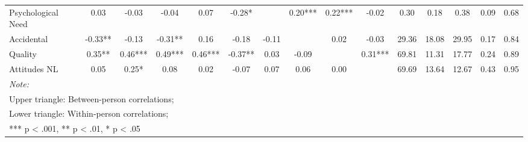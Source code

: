 \begin{table}
\begin{minipage}[t][\textheight][t]{\textwidth}
{\begin{tabular}[t]{lcccccccccccccc}
\hspace{1em}Psychological Need & 0.03 & -0.03 & -0.04 & 0.07 & -0.28* &  & 0.20*** & 0.22*** & -0.02 & 0.30 & 0.18 & 0.38 & 0.09 & 0.68\\
\hspace{1em}Accidental & -0.33** & -0.13 & -0.31** & 0.16 & -0.18 & -0.11 &  & 0.02 & -0.03 & 29.36 & 18.08 & 29.95 & 0.17 & 0.84\\
\hspace{1em}Quality & 0.35** & 0.46*** & 0.49*** & 0.46*** & -0.37** & 0.03 & -0.09 &  & 0.31*** & 69.81 & 11.31 & 17.77 & 0.24 & 0.89\\
\hspace{1em}Attitudes NL & 0.05 & 0.25* & 0.08 & 0.02 & -0.07 & 0.07 & 0.06 & 0.00 &  & 69.69 & 13.64 & 12.67 & 0.43 & 0.95\\
\bottomrule
\multicolumn{15}{l}{\rule{0pt}{1em}\textit{Note: }}\\
\multicolumn{15}{l}{\rule{0pt}{1em}Upper triangle: Between-person correlations;}\\
\multicolumn{15}{l}{\rule{0pt}{1em}Lower triangle: Within-person correlations;}\\
\multicolumn{15}{l}{\rule{0pt}{1em}*** p < .001, ** p < .01,  * p < .05}\\
\end{tabular}}
\end{minipage}
\end{table}
